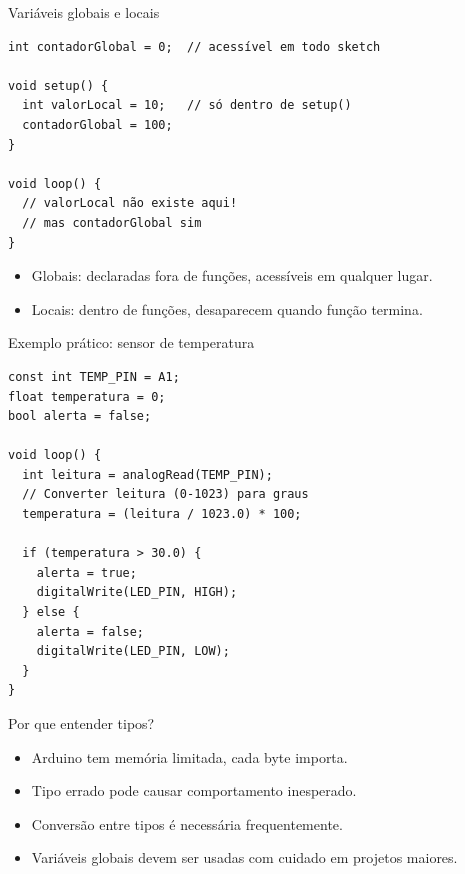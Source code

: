 \documentclass[10pt]{beamer}
\begin{document}
\begin{frame}[fragile]{Variáveis globais e locais}
\begin{lstlisting}
int contadorGlobal = 0;  // acessível em todo sketch

void setup() {
  int valorLocal = 10;   // só dentro de setup()
  contadorGlobal = 100;
}

void loop() {
  // valorLocal não existe aqui!
  // mas contadorGlobal sim
}
\end{lstlisting}

  \begin{itemize}
    \item Globais: declaradas fora de funções, acessíveis em qualquer lugar.
    \item Locais: dentro de funções, desaparecem quando função termina.
  \end{itemize}
\end{frame}

\begin{frame}[fragile]{Exemplo prático: sensor de temperatura}
\begin{lstlisting}
const int TEMP_PIN = A1;
float temperatura = 0;
bool alerta = false;

void loop() {
  int leitura = analogRead(TEMP_PIN);
  // Converter leitura (0-1023) para graus
  temperatura = (leitura / 1023.0) * 100;
  
  if (temperatura > 30.0) {
    alerta = true;
    digitalWrite(LED_PIN, HIGH);
  } else {
    alerta = false;
    digitalWrite(LED_PIN, LOW);
  }
}
\end{lstlisting}
\end{frame}

\begin{frame}{Por que entender tipos?}
  \begin{itemize}
    \item Arduino tem memória limitada, cada byte importa.
    \item Tipo errado pode causar comportamento inesperado.
    \item Conversão entre tipos é necessária frequentemente.
    \item Variáveis globais devem ser usadas com cuidado em projetos maiores.
  \end{itemize}
\end{frame}
\end{document}
